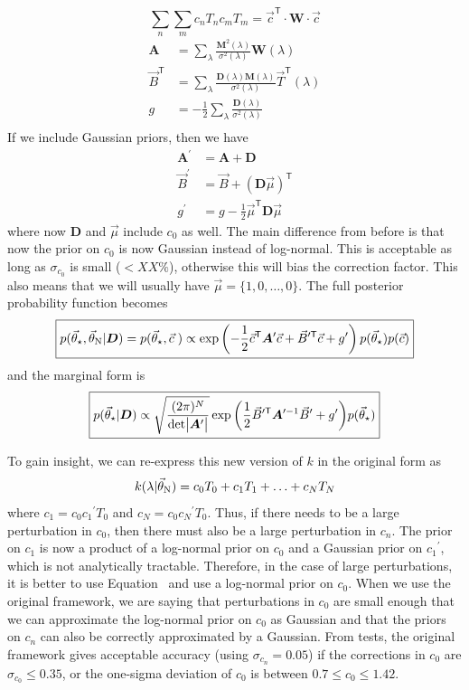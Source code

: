 \documentclass[preprint]{aastex} %
\newcommand{\vt}{\vec{\theta}}
\newcommand{\vstar}{\vt_{\star}}
\newcommand{\vN}{\vt_{\rm N}}
\newcommand{\vc}{\vec{c}}
\newcommand{\fM}{ {\bm M}}
\newcommand{\fD}{ {\bm D}}
\newcommand{\trans}{\mathsf{T}}
\begin{document}
\begin{equation}
  \sum_n \sum_m c_n T_n c_m T_m = \vc^\trans \cdot {\bm W} \cdot \vc
\end{equation}
\begin{align}
  {\bm A} &= \sum_\lambda \frac{\fM^2(\lambda)}{\sigma^2(\lambda)} {\bm W}(\lambda)\\
  \vec{B}^\trans &= \sum_\lambda \frac{\fD(\lambda) \fM(\lambda) }{\sigma^2(\lambda)} \vec{T}^\trans(\lambda)\\
  g &= -\frac{1}{2} \sum_\lambda \frac{\fD(\lambda)}{\sigma^2(\lambda)}\\
\end{align}
If we include Gaussian priors, then we have 
\begin{align}
  {\bm A}^\prime &= {\bm A} + {\bm D}\\
  \vec{B}^\prime &= \vec{B} + ({\bm D} \vec{\mu})^\trans\\
  g^\prime &= g - \frac{1}{2} \vec{\mu}^\trans {\bm D} \vec{\mu} 
\end{align}
where now ${\bm D}$ and $\vec{\mu}$ include $c_0$ as well. The main difference from before is that now the prior on $c_0$ is now Gaussian instead of log-normal. This is acceptable as long as $\sigma_{c_0}$ is small ($< XX\%$), otherwise this will bias the correction factor. This also means that we will usually have $\vec{\mu} = \{1, 0, \ldots, 0\}$. The full posterior probability function becomes
 \begin{equation}
   \boxed{
  p(\vstar, \vN | \fD) = p(\vstar, \vc\;) \propto \exp \left ( - \frac{1}{2} \vc^\trans {\bm A}^\prime \vc + \vec{B}^{\prime \trans} \vc + g^\prime \right ) p(\vstar) p(\vc)
}
\end{equation}
and the marginal form is
\begin{equation}
  \boxed{
  p(\vstar | \fD) \propto \sqrt{\frac{(2 \pi )^N}{ {\rm det} \bigl |{\bm A}^\prime \bigr |}} \exp{ \left ( \frac{1}{2} \vec{B}^{\prime\trans} {\bm A}^{\prime -1} \vec{B}^\prime + g^\prime \right )} p(\vstar) 
}
\end{equation}

To gain insight, we can re-express this new version of $k$ in the original form as 
\begin{equation}
   k(\lambda | \vN) = c_0 T_0 + c_1 T_1 + \ldots + c_N T_N
\end{equation}
where $c_1 = c_0 {c_1}^\prime T_0$ and $c_N = c_0 {c_N}^\prime T_0$. Thus, if there needs to be a large perturbation in $c_0$, then there must also be a large perturbation in $c_n$. The prior on $c_1$ is now a product of a log-normal prior on $c_0$ and a Gaussian prior on ${c_1}^\prime$, which is not analytically tractable. Therefore, in the case of large perturbations, it is better to use Equation~ and use a log-normal prior on $c_0$. When we use the original framework, we are saying that perturbations in $c_0$ are small enough that we can approximate the log-normal prior on $c_0$ as Gaussian and that the priors on $c_n$ can also be correctly approximated by a Gaussian. From tests, the original framework gives acceptable accuracy (using $\sigma_{c_n} = 0.05$) if the corrections in $c_0$ are $\sigma_{c_0} \leq 0.35$, or the one-sigma deviation of $c_0$ is between $0.7 \leq c_0 \leq 1.42$. 
\end{document}
